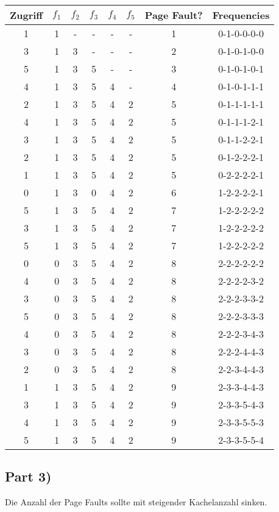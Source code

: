 \documentclass[10pt,a4paper]{article}
\begin{document}
\begin{tabular}{c|c|c|c|c|c|c|c}
  Zugriff & $f_{1}$ & $f_{2}$ & $f_{3}$ & $f_{4}$ & $f_{5}$ & Page Fault? & Frequencies\\\hline
  1 & 1 & - & - & - & - & 1 & 0-1-0-0-0-0\\
  3 & 1 & 3 & - & - & - & 2 & 0-1-0-1-0-0\\
  5 & 1 & 3 & 5 & - & - & 3 & 0-1-0-1-0-1\\
  4 & 1 & 3 & 5 & 4 & - & 4 & 0-1-0-1-1-1\\
  2 & 1 & 3 & 5 & 4 & 2 & 5 & 0-1-1-1-1-1\\
  4 & 1 & 3 & 5 & 4 & 2 & 5 & 0-1-1-1-2-1\\
  3 & 1 & 3 & 5 & 4 & 2 & 5 & 0-1-1-2-2-1\\
  2 & 1 & 3 & 5 & 4 & 2 & 5 & 0-1-2-2-2-1\\
  1 & 1 & 3 & 5 & 4 & 2 & 5 & 0-2-2-2-2-1\\
  0 & 1 & 3 & 0 & 4 & 2 & 6 & 1-2-2-2-2-1\\
  5 & 1 & 3 & 5 & 4 & 2 & 7 & 1-2-2-2-2-2\\
  3 & 1 & 3 & 5 & 4 & 2 & 7 & 1-2-2-2-2-2\\
  5 & 1 & 3 & 5 & 4 & 2 & 7 & 1-2-2-2-2-2\\
  0 & 0 & 3 & 5 & 4 & 2 & 8 & 2-2-2-2-2-2\\
  4 & 0 & 3 & 5 & 4 & 2 & 8 & 2-2-2-2-3-2\\
  3 & 0 & 3 & 5 & 4 & 2 & 8 & 2-2-2-3-3-2\\
  5 & 0 & 3 & 5 & 4 & 2 & 8 & 2-2-2-3-3-3\\
  4 & 0 & 3 & 5 & 4 & 2 & 8 & 2-2-2-3-4-3\\
  3 & 0 & 3 & 5 & 4 & 2 & 8 & 2-2-2-4-4-3\\
  2 & 0 & 3 & 5 & 4 & 2 & 8 & 2-2-3-4-4-3\\
  1 & 1 & 3 & 5 & 4 & 2 & 9 & 2-3-3-4-4-3\\
  3 & 1 & 3 & 5 & 4 & 2 & 9 & 2-3-3-5-4-3\\
  4 & 1 & 3 & 5 & 4 & 2 & 9 & 2-3-3-5-5-3\\
  5 & 1 & 3 & 5 & 4 & 2 & 9 & 2-3-3-5-5-4
\end{tabular}

\subsection*{Part 3)}

Die Anzahl der Page Faults sollte mit steigender Kachelanzahl sinken.
\end{document}
